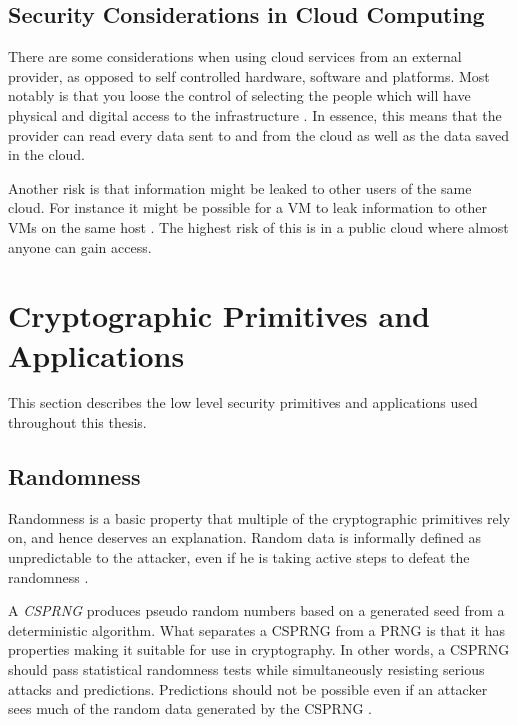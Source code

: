 \documentclass[pdftex,english,10pt,b5paper,twoside]{book}
\begin{document}

\subsection{Security Considerations in Cloud Computing}

There are some considerations when using cloud services from an external
provider, as opposed to self controlled hardware, software and platforms. Most
notably is that you loose the control of selecting the people which will have
physical and digital access to the infrastructure \cite{cloud_getoff}. In
essence, this means that the provider can read every data sent to and from the
cloud as well as the data saved in the cloud.

Another risk is that information might be leaked to other users of the same
cloud. For instance it might be possible for a \ac{VM} to leak information
to other \acp{VM} on the same host \cite{cloud_getoff}. The highest risk of
this is in a public cloud where almost anyone can gain access.


\section{Cryptographic Primitives and Applications}

This section describes the low level security primitives and applications used
throughout this thesis.

\subsection{Randomness}

Randomness is a basic property that multiple of the cryptographic
primitives rely on, and hence deserves an explanation. Random data is
informally defined as unpredictable to the attacker, even if he is taking
active steps to defeat the randomness \cite[p. 137]{schneier}.

A \emph{\ac{CSPRNG}} produces pseudo random numbers based on a generated seed
from a deterministic algorithm. What separates a \ac{CSPRNG} from a PRNG is
that it has properties making it suitable for use in cryptography. In other
words, a \ac{CSPRNG} should pass statistical randomness tests while
simultaneously resisting serious attacks and predictions. Predictions should
not be possible even if an attacker sees much of the random data generated by
the \ac{CSPRNG} \cite[p. 140]{schneier}.
\end{document}
